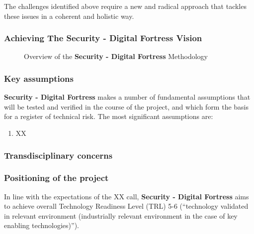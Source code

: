 \documentclass[a4paper,11pt]{article}
\newcommand{\project}[1]{\textbf{#1}\xspace}
\newcommand{\SECURITY}{\project{Security - Digital Fortress}}
\newcommand{\TheProject}{\SECURITY}
\begin{document}
The challenges identified above require a new and radical
approach that tackles these issues in a coherent and
holistic way. 

\subsubsection{Achieving The \TheProject{} Vision}

\begin{figure}[tp]
  \begin{center}
  \vspace{-5mm}
  \caption{Overview of the \TheProject{} Methodology}
  \label{fig:overview}
  \end{center}
  \end{figure}

\subsubsection*{Key assumptions}


\TheProject{} makes a number of fundamental assumptions that will be tested and verified in the course of the project,
and which form the basis for a register of technical risk.  The most significant assumptions are:

\begin{enumerate}[{A}1)]
\item XX
\end{enumerate}

\subsubsection*{Transdisciplinary concerns}


\subsubsection{Positioning of the project}

In line with the expectations of the XX call, \TheProject{} aims
to achieve overall Technology Readiness Level (TRL) 5-6 (``technology
validated in relevant environment (industrially relevant environment in
the case of key enabling technologies)'').
\end{document}
